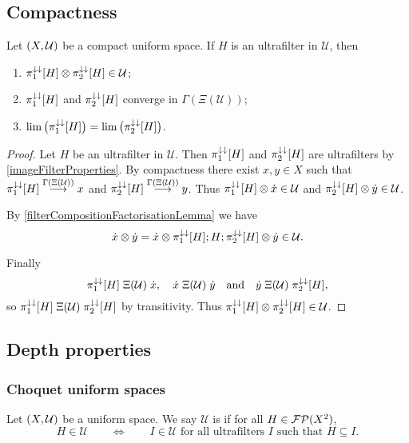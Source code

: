 \subsection{Compactness}
\begin{proposition} \label{compactUltrafilterFactorisation}
Let $\sSet{X,\mathcal{U}}$ be a compact uniform space. If $H$ is an ultrafilter in $\mathcal{U}$, then 
\begin{enumerate}
\item $\pi_1^{\downarrow\downarrow}[H]\otimes \pi_2^{\downarrow\downarrow}[H] \in\mathcal{U}$;
\item $\pi_1^{\downarrow\downarrow}[H]$ and $\pi_2^{\downarrow\downarrow}[H]$ converge in $\Gamma(\Xi(\mathcal{U}))$;
\item $\lim\big(\pi_1^{\downarrow\downarrow}[H]\big) = \lim\big(\pi_2^{\downarrow\downarrow}[H]\big)$.
\end{enumerate}
\end{proposition}
\begin{proof}
Let $H$ be an ultrafilter in $\mathcal{U}$. Then $\pi_1^{\downarrow\downarrow}[H]$ and $\pi_2^{\downarrow\downarrow}[H]$ are ultrafilters by \ref{imageFilterProperties}. By compactness there exist $x,y\in X$ such that $\pi_1^{\downarrow\downarrow}[H] \overset{\Gamma(\Xi(\mathcal{U}))}{\longrightarrow} x$ and $\pi_2^{\downarrow\downarrow}[H] \overset{\Gamma(\Xi(\mathcal{U}))}{\longrightarrow} y$. Thus $\pi_1^{\downarrow\downarrow}[H]\otimes \dot{x}\in\mathcal{U}$ and $\pi_2^{\downarrow\downarrow}[H]\otimes \dot{y}\in\mathcal{U}$. 

By \ref{filterCompositionFactorisationLemma} we have
\[ \dot{x}\otimes \dot{y} = \dot{x}\otimes \pi_1^{\downarrow\downarrow}[H]; H; \pi_2^{\downarrow\downarrow}[H] \otimes \dot{y} \in \mathcal{U}. \]

Finally
\[ \pi_1^{\downarrow\downarrow}[H] \mathrel{\Xi(\mathcal{U})} \dot{x}, \quad \dot{x} \mathrel{\Xi(\mathcal{U})} \dot{y} \quad\text{and}\quad \dot{y}\mathrel{\Xi(\mathcal{U})} \pi_2^{\downarrow\downarrow}[H], \]
so $\pi_1^{\downarrow\downarrow}[H] \mathrel{\Xi(\mathcal{U})} \pi_2^{\downarrow\downarrow}[H]$ by transitivity. Thus $\pi_1^{\downarrow\downarrow}[H]\otimes \pi_2^{\downarrow\downarrow}[H] \in \mathcal{U}$.
\end{proof}

\subsection{Depth properties}
\subsubsection{Choquet uniform spaces}
\begin{definition}
Let $\sSet{X,\mathcal{U}}$ be a uniform space. We say $\mathcal{U}$ is  if for all $H\in \operatorname{\mathcal{FP}}(X^2)$,
\[ H\in\mathcal{U} \qquad\iff\qquad \text{$I \in \mathcal{U}$ for all ultrafilters $I$ such that $H\subseteq I$.} \]
\end{definition}


